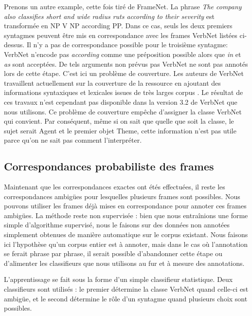 Prenons un autre example, cette fois tiré de FrameNet. La phrase \emph{The
company also classifies short and wide radius ruts according to their severity}
est transformée en NP V NP according PP. Dans ce cas, seuls les deux premiers
syntagmes peuvent être mis en correspondance avec les frames VerbNet listées
ci-dessus. Il n'y a pas de correspondance possible pour le troisième syntagme:
VerbNet n'encode pas \emph{according} comme une préposition possible alors que
\emph{in} et \emph{as} sont acceptées. De tels arguments non prévus pas VerbNet
ne sont pas annotés lors de cette étape. C'est ici un problème de couverture.
Les auteurs de VerbNet travaillent actuellement sur la couverture de la
ressource en ajoutant des informations syntaxiques et lexicales issues de très
larges corpus \citep{bonial2013expanding}. Le résultat de ces travaux n'est
cependant pas disponible dans la version 3.2 de VerbNet que nous utilisons. Ce
problème de couverture empêche d'assigner la classe VerbNet qui convient. Par
conséquent, même si on sait que quelle que soit la classe, le sujet serait
Agent et le premier objet Theme, cette information n'est pas utile parce qu'on
ne sait pas comment l'interpréter.

\subsection{Correspondances probabiliste des frames}
\label{subsec:probability}


Maintenant que les correspondances exactes ont étés effectuées, il reste les
correspondances ambigües pour lesquelles plusieurs frames sont possibles.  Nous
pouvons utiliser les frames déjà mises en correspondance pour annoter ces
frames ambigües. La méthode reste non supervisée : bien que nous entraînions
une forme simple d'algorithme supervisé, nous le faisons sur des données non
annotées simplement obtenues de manière automatique sur le corpus existant.
Nous faisons ici l'hypothèse qu'un corpus entier est à annoter, mais dans le
cas où l'annotation se ferait phrase par phrase, il serait possible
d'abandonner cette étape ou d'alimenter les classifieurs que nous utilisons au
fur et à mesure des annotations.

L'apprentissage se fait sous la forme d'un simple classifieur statistique. Deux
classifieurs sont utilisés : le premier détermine la classe VerbNet quand
celle-ci est ambigüe, et le second détermine le rôle d'un syntagme quand
plusieurs choix sont possibles.

